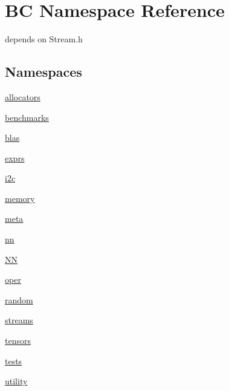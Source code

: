 \hypertarget{namespaceBC}{}\section{BC Namespace Reference}
\label{namespaceBC}


depends on Stream.\+h  


\subsection*{Namespaces}
\begin{DoxyCompactItemize}
\item 
 \hyperlink{namespaceBC_1_1allocators}{allocators}
\item 
 \hyperlink{namespaceBC_1_1benchmarks}{benchmarks}
\item 
 \hyperlink{namespaceBC_1_1blas}{blas}
\item 
 \hyperlink{namespaceBC_1_1exprs}{exprs}
\item 
 \hyperlink{namespaceBC_1_1i2c}{i2c}
\item 
 \hyperlink{namespaceBC_1_1memory}{memory}
\item 
 \hyperlink{namespaceBC_1_1meta}{meta}
\item 
 \hyperlink{namespaceBC_1_1nn}{nn}
\item 
 \hyperlink{namespaceBC_1_1NN}{NN}
\item 
 \hyperlink{namespaceBC_1_1oper}{oper}
\item 
 \hyperlink{namespaceBC_1_1random}{random}
\item 
 \hyperlink{namespaceBC_1_1streams}{streams}
\item 
 \hyperlink{namespaceBC_1_1tensors}{tensors}
\item 
 \hyperlink{namespaceBC_1_1tests}{tests}
\item 
 \hyperlink{namespaceBC_1_1utility}{utility}
\end{DoxyCompactItemize}
